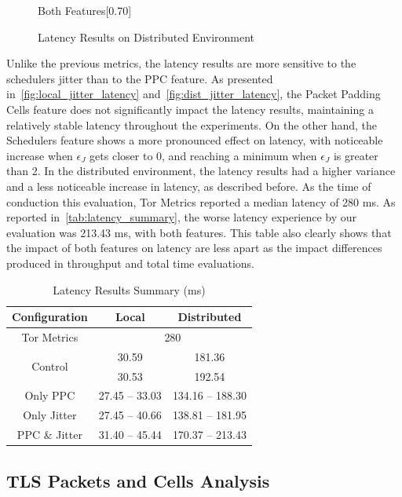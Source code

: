 \begin{figure}[htbp]
\begin{subcaptionbox}{Both Features\label{fig:dist_both_latency}}[0.70\textwidth]
    \end{subcaptionbox}
    \caption{Latency Results on Distributed Environment}\label{fig:dist_latency}
\end{figure}

Unlike the previous metrics, the latency results are more sensitive to the schedulers jitter than to the PPC feature. As presented in~\autoref{fig:local_jitter_latency} and~\autoref{fig:dist_jitter_latency}, the Packet Padding Cells feature does not significantly impact the latency results, maintaining a relatively stable latency throughout the experiments. On the other hand, the Schedulers feature shows a more pronounced effect on latency, with noticeable increase when $\epsilon_{J}$ gets closer to 0, and reaching a minimum when $\epsilon_{J}$ is greater than 2. In the distributed environment, the latency results had a higher variance and a less noticeable increase in latency, as described before.
As the time of conduction this evaluation, Tor Metrics reported a median latency of 280 ms. As reported in~\autoref{tab:latency_summary}, the worse latency experience by our evaluation was 213.43 ms, with both features. This table also clearly shows that the impact of both features on latency are less apart as the impact differences produced in throughput and total time evaluations. 
\begin{table}[htbp]
    \centering
    \begin{tabular}{|c|c|c|}
    \hline
    \textbf{Configuration} & \textbf{Local} & \textbf{Distributed}\\
    \hline
    Tor Metrics & \multicolumn{2}{c|}{280}  \\ 
    \hline
    \multirow{2}{*}{Control} & 30.59 & 181.36 \\ 
    & 30.53 & 192.54\\
    \hline
    Only PPC & 27.45 – 33.03 & 134.16 – 188.30\\
    \hline
    Only Jitter & 27.45 – 40.66 & 138.81 – 181.95 \\
    \hline
    PPC \& Jitter & 31.40 – 45.44 & 170.37 – 213.43\\
    \hline
    \end{tabular}
    \caption{Latency Results Summary (ms)}\label{tab:latency_summary}
\end{table}

\FloatBarrier
\subsection{TLS Packets and Cells Analysis}

